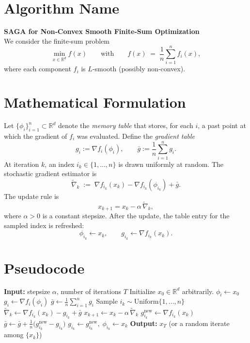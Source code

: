 \documentclass{article}
\newcommand{\R}{\mathbb{R}}
\newcommand{\grad}{\nabla}
\begin{document}
\section*{Algorithm Name}
\textbf{SAGA for Non‑Convex Smooth Finite‑Sum Optimization}\\
We consider the finite‑sum problem  
\[
\min_{x\in\R^{d}} f(x)\qquad\text{with}\qquad 
f(x)\;=\;\frac1n\sum_{i=1}^{n} f_i(x),
\]
where each component $f_i$ is $L$‑smooth (possibly non‑convex).

\section*{Mathematical Formulation}
Let $\{\phi_i\}_{i=1}^{n}\subset\R^{d}$ denote the \emph{memory table} that stores, for each $i$, a past point at which the gradient of $f_i$ was evaluated.
Define the \emph{gradient table} 
\[
g_i:=\grad f_i(\phi_i),\qquad 
\bar g:=\frac1n\sum_{i=1}^{n} g_i .
\]
At iteration $k$, an index $i_k\in\{1,\dots,n\}$ is drawn uniformly at random.
The stochastic gradient estimator is
\[
\widetilde{\nabla}_k \;:=\; \grad f_{i_k}(x_k)-\grad f_{i_k}(\phi_{i_k})+\bar g .
\tag{1}
\]
The update rule is
\[
x_{k+1}=x_k-\alpha\,\widetilde{\nabla}_k ,
\tag{2}
\]
where $\alpha>0$ is a constant stepsize.
After the update, the table entry for the sampled index is refreshed:
\[
\phi_{i_k}\gets x_k,\qquad 
g_{i_k}\gets \grad f_{i_k}(x_k) .
\tag{3}
\]

\section*{Pseudocode}
\begin{algorithm}[H]
\caption{SAGA for non‑convex $L$‑smooth finite‑sum}
\begin{algorithmic}[1]
\State \textbf{Input:} stepsize $\alpha$, number of iterations $T$
\State Initialize $x_0\in\R^{d}$ arbitrarily.
    \State $\phi_i\gets x_0$ 
    \State $g_i\gets \grad f_i(\phi_i)$
\EndFor
\State $\bar g\gets \frac1n\sum_{i=1}^{n} g_i$
    \State Sample $i_k\sim\text{Uniform}\{1,\dots,n\}$
    \State $\widetilde{\nabla}_k\gets \grad f_{i_k}(x_k)-g_{i_k}+\bar g$ 
    \State $x_{k+1}\gets x_k-\alpha\,\widetilde{\nabla}_k$ 
    \State $g_{i_k}^{\text{new}}\gets \grad f_{i_k}(x_k)$
    \State $\bar g\gets \bar g+\frac{1}{n}\bigl(g_{i_k}^{\text{new}}-g_{i_k}\bigr)$
    \State $g_{i_k}\gets g_{i_k}^{\text{new}},\;\phi_{i_k}\gets x_k$ 
\EndFor
\State \textbf{Output:} $x_T$ (or a random iterate among $\{x_k\}$)
\end{algorithmic}
\end{algorithm}
\end{document}
